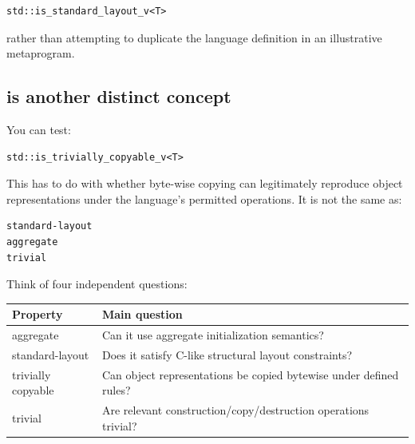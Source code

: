\begin{verbatim}
std::is_standard_layout_v<T>
\end{verbatim}

rather than attempting to duplicate the language definition in an illustrative metaprogram.

\subsection{\texorpdfstring{ is another distinct concept}{ is another distinct concept}}\label{01-foundations-i-ch003-trivially_copyable-is-another-distinct-concept}

\hypertarget{01-foundations-i-ch003-trivially_copyable-is-another-distinct-concept}{}

You can test:

\begin{verbatim}
std::is_trivially_copyable_v<T>
\end{verbatim}

This has to do with whether byte-wise copying can legitimately reproduce object representations under the language's permitted operations. It is not the same as:

\begin{verbatim}
standard-layout
aggregate
trivial
\end{verbatim}

Think of four independent questions:

{\def\LTcaptype{none} %
\begin{longtable}[]{@{}
  >{\raggedright\arraybackslash}p{}
  >{\raggedright\arraybackslash}p{}@{}}
\toprule\noalign{}
\begin{minipage}[b]{\linewidth}\raggedright
Property
\end{minipage} & \begin{minipage}[b]{\linewidth}\raggedright
Main question
\end{minipage} \\
\midrule\noalign{}
\endhead
\bottomrule\noalign{}
\endlastfoot
aggregate & Can it use aggregate initialization semantics? \\
standard-layout & Does it satisfy C-like structural layout constraints? \\
trivially copyable & Can object representations be copied bytewise under defined rules? \\
trivial & Are relevant construction/copy/destruction operations trivial? \\
\end{longtable}
}

